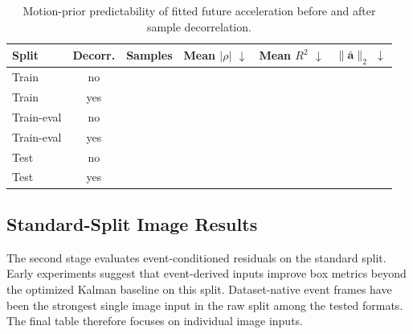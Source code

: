 \begin{table}[t]
  \centering
  \caption{Motion-prior predictability of fitted future acceleration before and after sample decorrelation.}
  \label{tab:correlation}
  \begin{tabular}{lccccc}
    \toprule
    Split & Decorr. & Samples & Mean $|\rho|$ $\downarrow$ & Mean $R^2$ $\downarrow$ & $\|\bar{\mathbf{a}}\|_2$ $\downarrow$ \\
    \midrule
    Train & no & \todo{} & \todo{} & \todo{} & \todo{} \\
    Train & yes & \todo{} & \todo{} & \todo{} & \todo{} \\
    Train-eval & no & \todo{} & \todo{} & \todo{} & \todo{} \\
    Train-eval & yes & \todo{} & \todo{} & \todo{} & \todo{} \\
    Test & no & \todo{} & \todo{} & \todo{} & \todo{} \\
    Test & yes & \todo{} & \todo{} & \todo{} & \todo{} \\
    \bottomrule
  \end{tabular}
\end{table}

\subsection{Standard-Split Image Results}

The second stage evaluates event-conditioned residuals on the standard split. Early experiments suggest that event-derived inputs improve box metrics beyond the optimized Kalman baseline on this split. Dataset-native event frames have been the strongest single image input in the raw split among the tested formats. The final table therefore focuses on individual image inputs.

